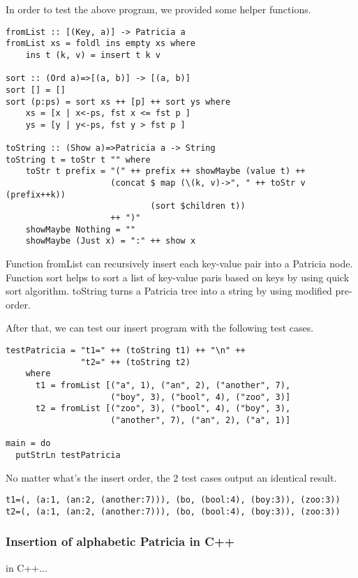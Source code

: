\documentclass{article}
\begin{document}
In order to test the above program, we provided some helper functions.

\begin{lstlisting}
fromList :: [(Key, a)] -> Patricia a
fromList xs = foldl ins empty xs where
    ins t (k, v) = insert t k v

sort :: (Ord a)=>[(a, b)] -> [(a, b)]
sort [] = []
sort (p:ps) = sort xs ++ [p] ++ sort ys where
    xs = [x | x<-ps, fst x <= fst p ]
    ys = [y | y<-ps, fst y > fst p ]

toString :: (Show a)=>Patricia a -> String
toString t = toStr t "" where
    toStr t prefix = "(" ++ prefix ++ showMaybe (value t) ++
                     (concat $ map (\(k, v)->", " ++ toStr v (prefix++k))
                             (sort $children t))
                     ++ ")"
    showMaybe Nothing = ""
    showMaybe (Just x) = ":" ++ show x
\end{lstlisting}

Function fromList can recursively insert each key-value pair into a Patricia node.
Function sort helps to sort a list of key-value paris based on keys by using quick sort
algorithm. toString turns a Patricia tree into a string by using modified pre-order.

After that, we can test our insert program with the following test cases.

\begin{lstlisting}
testPatricia = "t1=" ++ (toString t1) ++ "\n" ++
               "t2=" ++ (toString t2)
    where
      t1 = fromList [("a", 1), ("an", 2), ("another", 7), 
                     ("boy", 3), ("bool", 4), ("zoo", 3)]
      t2 = fromList [("zoo", 3), ("bool", 4), ("boy", 3), 
                     ("another", 7), ("an", 2), ("a", 1)]

main = do
  putStrLn testPatricia
\end{lstlisting}

No matter what's the insert order, the 2 test cases output an identical result.

\begin{verbatim}
t1=(, (a:1, (an:2, (another:7))), (bo, (bool:4), (boy:3)), (zoo:3))
t2=(, (a:1, (an:2, (another:7))), (bo, (bool:4), (boy:3)), (zoo:3))
\end{verbatim}

\subsubsection*{Insertion of alphabetic Patricia in C++}
in C++...
\end{document}
